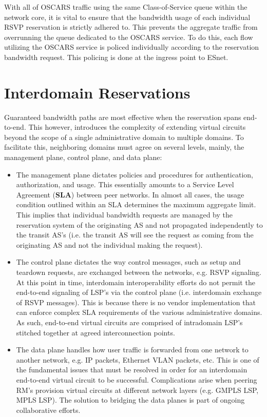 \documentclass[conference]{IEEEtran}
\begin{document}
With all of OSCARS traffic using the same Class-of-Service queue within the 
network core, it is vital to ensure that the bandwidth usage of each 
individual 
RSVP reservation is strictly adhered to.  This prevents the aggregate traffic 
from overrunning the queue dedicated to the OSCARS service.  To do this, each 
flow utilizing the OSCARS service is policed individually according to the 
reservation bandwidth request.  This policing is done at the ingress point to 
ESnet.


\section{Interdomain Reservations}

Guaranteed bandwidth paths are most effective 
when the reservation spans end-to-end.  This however, introduces the 
complexity of extending virtual circuits beyond the scope of a 
single administrative domain to multiple domains.  To facilitate this, 
neighboring domains must agree on several levels, mainly, the management plane, 
control plane, and data plane:

\begin{itemize}
\item
The management plane dictates policies and procedures for authentication, 
authorization, and usage.  This essentially amounts to a Service Level 
Agreement (\textbf{SLA}) between peer networks.  In almost all cases, the 
usage 
condition outlined within an SLA determines the maximum aggregate limit.  
This implies that individual bandwidth requests are managed by the reservation 
system of the originating AS and not propagated independently to the transit 
AS's 
(i.e. the transit AS will see the request as coming from the originating AS and not the individual making the request).

\item
The control plane dictates the way control messages, such as setup and 
teardown requests, are exchanged between the networks, e.g. RSVP signaling.
At this point in time, interdomain interoperability efforts do not permit
the end-to-end signaling of LSP's via the control plane (i.e. interdomain 
exchange of RSVP messages).  This is because
there is no vendor implementation that can enforce complex SLA requirements of 
the various administrative domains.  As such, end-to-end virtual circuits are
comprised
of intradomain LSP's stitched together at agreed interconnection points.

\item
The data plane handles how user traffic is forwarded from one network to 
another network, e.g. IP packets, Ethernet VLAN packets, etc.  This is one of 
the fundamental issues that must be resolved in order for an interdomain 
end-to-end virtual circuit to be successful.  Complications arise when 
peering RM's provision virtual circuits at different network layers (e.g. 
GMPLS LSP, MPLS LSP).  The solution to bridging the data planes is part of 
ongoing collaborative efforts.
\end{itemize}
\end{document}
